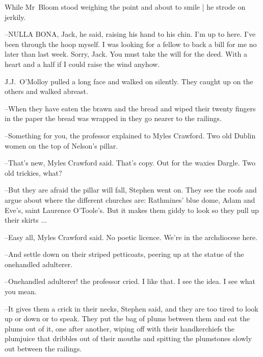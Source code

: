 While Mr~Bloom stood weighing the point
and about to smile |
he strode on jerkily.



--NULLA BONA, Jack,
he said,
raising his hand to his chin.
I'm up to here.
I've been through the hoop myself.
I was looking for a fellow to back a bill for me no later than last week.
Sorry, Jack.
You must take the will for the deed.
With a heart and a half if I could raise the wind anyhow.

J.J.~O'Molloy pulled a long face and walked on silently.
They caught up on the others and walked abreast.

--When they have eaten the brawn and the bread
and wiped their twenty fingers in the paper the bread was wrapped in
they go nearer to the railings.

--Something for you,
the professor explained to Myles Crawford.
Two old Dublin women on the top of Nelson's pillar.



--That's new,
Myles Crawford said.
That's copy.
Out for the waxies Dargle.
Two old trickies, what?

--But they are afraid the pillar will fall,
Stephen went on.
They see the roofs and argue about where the different churches are:
Rathmines' blue dome,
Adam and Eve's,
saint Laurence O'Toole's.
But it makes them giddy to look
so they pull up their skirts ...



--Easy all,
Myles Crawford said.
No poetic licence.
We're in the archdiocese here.

--And settle down on their striped petticoats,
peering up at the statue of the onehandled adulterer.

--Onehandled adulterer!
the professor cried.
I like that.
I see the idea.
I see what you mean.



--It gives them a crick in their necks,
Stephen said,
and they are too tired to look up or down or to speak.
They put the bag of plums between them and eat the plums out of it,
one after another,
wiping off with their handkerchiefs the plumjuice
that dribbles out of their mouths
and spitting the plumstones slowly out between the railings.

